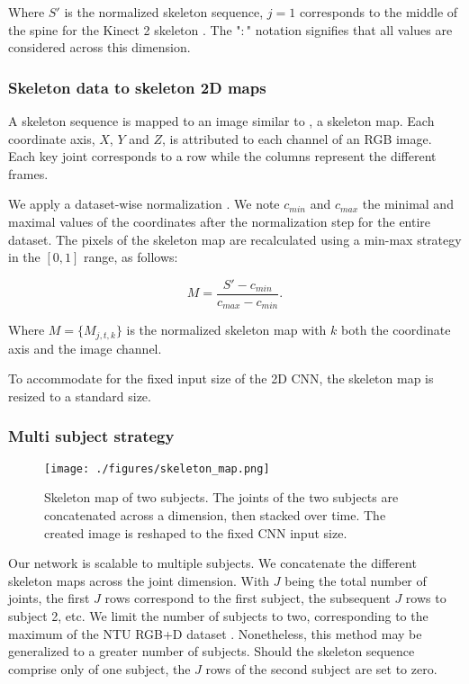 \documentclass[letterpaper, 10 pt, conference]{ieeeconf}
\begin{document}
Where $S'$ is the normalized skeleton sequence, $j=1$ corresponds to the middle of the spine for the Kinect 2 skeleton \cite{zhang2012microsoft}. The "$:$" notation signifies that all values are considered across this dimension.

\subsubsection{Skeleton data to skeleton 2D maps}

A skeleton sequence is mapped to an image similar to \cite{du2015skeleton}, a skeleton map. Each coordinate axis, $X$, $Y$ and $Z$, is attributed to each channel of an RGB image. Each key joint corresponds to a row while the columns represent the different frames. 

We apply a dataset-wise normalization \cite{du2015skeleton}. We note $c_{min}$ and $c_{max}$ the minimal and maximal values of the coordinates after the normalization step for the entire dataset. The pixels of the skeleton map are recalculated using a min-max strategy in the $[0, 1]$ range, as follows: 

\begin{equation}
M = \frac{S' - c_{min}}{c_{max} - c_{min}}.
\end{equation}

Where $M = \{M_{j,t,k}\}$ is the normalized skeleton map with $k$ both the coordinate axis and the image channel. 

To accommodate for the fixed input size of the 2D CNN, the skeleton map is resized to a standard size.

\subsubsection{Multi subject strategy}

\begin{figure}[t]
  \centering
  \texttt{[image: ./figures/skeleton\_map.png]}
  \caption{Skeleton map of two subjects. The joints of the two subjects are concatenated across a dimension, then stacked over time. The created image is reshaped to the fixed CNN input size.}
  \label{skeleton_map}
\end{figure}


Our network is scalable to multiple subjects. We concatenate the different skeleton maps across the joint dimension. With $J$ being the total number of joints, the first $J$ rows correspond to the first subject, the subsequent $J$ rows to subject 2, etc. We limit the number of subjects to two, corresponding to the maximum of the NTU RGB+D dataset \cite{shahroudy2016ntu}. Nonetheless, this method may be generalized to a greater number of subjects. Should the skeleton sequence comprise only of one subject, the $J$ rows of the second subject are set to zero. 
\end{document}
